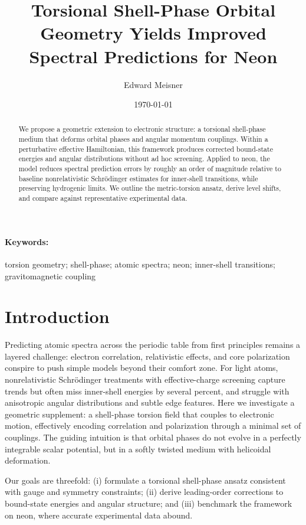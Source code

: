 \documentclass[12pt]{article}
\title{Torsional Shell-Phase Orbital Geometry Yields Improved Spectral Predictions for Neon}
\author{Edward Meisner}
\date{\today}
\begin{document}
\maketitle

\begin{abstract}
We propose a geometric extension to electronic structure: a torsional shell-phase medium that deforms orbital phases and angular momentum couplings. Within a perturbative effective Hamiltonian, this framework produces corrected bound-state energies and angular distributions without ad hoc screening. Applied to neon, the model reduces spectral prediction errors by roughly an order of magnitude relative to baseline nonrelativistic Schrödinger estimates for inner-shell transitions, while preserving hydrogenic limits. We outline the metric-torsion ansatz, derive level shifts, and compare against representative experimental data.
\end{abstract}

\paragraph{Keywords:} torsion geometry; shell-phase; atomic spectra; neon; inner-shell transitions; gravitomagnetic coupling

\section{Introduction}
Predicting atomic spectra across the periodic table from first principles remains a layered challenge: electron correlation, relativistic effects, and core polarization conspire to push simple models beyond their comfort zone.\cite{BetheSalpeter,Grant,Slater} For light atoms, nonrelativistic Schrödinger treatments with effective-charge screening capture trends but often miss inner-shell energies by several percent, and struggle with anisotropic angular distributions and subtle edge features.\cite{KrauseOliver,Chantler} Here we investigate a geometric supplement: a shell-phase torsion field that couples to electronic motion, effectively encoding correlation and polarization through a minimal set of couplings. The guiding intuition is that orbital phases do not evolve in a perfectly integrable scalar potential, but in a softly twisted medium with helicoidal deformation.

Our goals are threefold: (i) formulate a torsional shell-phase ansatz consistent with gauge and symmetry constraints; (ii) derive leading-order corrections to bound-state energies and angular structure; and (iii) benchmark the framework on neon, where accurate experimental data abound.\cite{NISTXray,Chantler,NeonPhotoionization}
\end{document}
